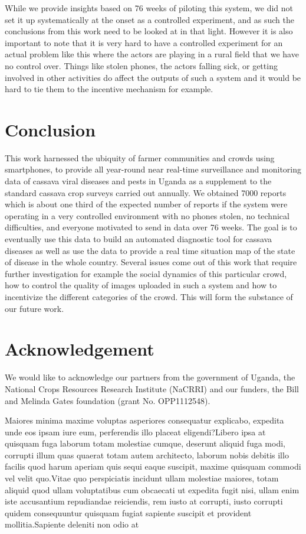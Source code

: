 \documentclass[letterpaper]{article} %
\begin{document}
While we provide insights based on 76 weeks of piloting this system, we did not set it up systematically at the onset as a controlled experiment, and as such the conclusions from this work need to be looked at in that light. However it is also important to note that it is very hard to have a controlled experiment for an actual problem like this where the actors are playing in a rural field that we have no control over. Things like stolen phones, the actors falling sick, or getting involved in other activities do affect the outputs of such a system and it would be hard to tie them to the incentive mechanism for example.


\vspace{-0.99mm}
\vspace{-1.64mm}
\section{Conclusion}

This work harnessed the ubiquity of farmer communities and crowds using smartphones, to provide all year-round near real-time surveillance and monitoring data of cassava viral diseases and pests in Uganda as a supplement to the standard cassava crop surveys carried out annually. We obtained 7000 reports which is about one third of the expected number of reports if the system were operating in a very controlled environment with no phones stolen, no technical difficulties, and everyone motivated to send in data over 76 weeks. The goal is to eventually use this data to build an automated diagnostic tool for cassava diseases as well as use the data to provide a real time situation map of the state of disease in the whole country. Several issues come out of this work that require further investigation for example the social dynamics of this particular crowd, how to control the quality of images uploaded in such a system and how to incentivize the different categories of the crowd. This will form the substance of our future work.


\section{Acknowledgement}
We would like to acknowledge our partners from the government of Uganda, the National Crops Resources Research Institute (NaCRRI) and our funders, the Bill and Melinda Gates foundation (grant No. OPP1112548).


Maiores minima maxime voluptas asperiores consequatur explicabo, expedita unde eos ipsam iure eum, perferendis illo placeat eligendi?Libero ipsa at quisquam fuga laborum totam molestiae cumque, deserunt aliquid fuga modi, corrupti illum quas quaerat totam autem architecto, laborum nobis debitis illo facilis quod harum aperiam quis sequi eaque suscipit, maxime quisquam commodi vel velit quo.Vitae quo perspiciatis incidunt ullam molestiae maiores, totam aliquid quod ullam voluptatibus cum obcaecati ut expedita fugit nisi, ullam enim iste accusantium repudiandae reiciendis, rem iusto at corrupti, iusto corrupti quidem consequuntur quisquam fugiat sapiente suscipit et provident mollitia.Sapiente deleniti non odio at

\end{document}
